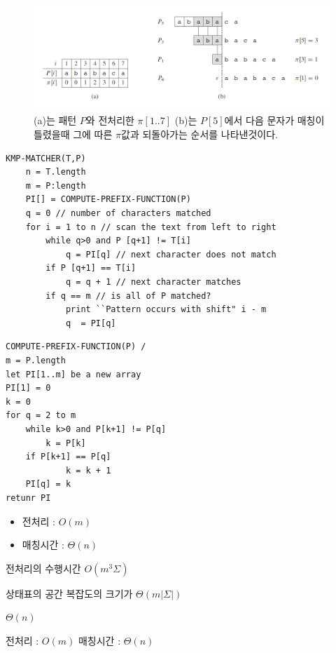 \begin{frame}
\begin{figure}[h!]
    \centering
    \includegraphics[scale=0.4]{pic4.PNG}
    \caption{(a)는 패턴 $P$와 전처리한 $\pi[1..7]$ (b)는 $P[5]$에서 다음 문자가 매칭이 틀렸을때 그에 따른 $\pi$값과 되돌아가는 순서를 나타낸것이다.}
\end{figure}

\begin{frame}
\begin{lstlisting}[style = CStyle]
KMP-MATCHER(T,P)
    n = T.length
    m = P:length
    PI[] = COMPUTE-PREFIX-FUNCTION(P)
    q = 0 // number of characters matched
    for i = 1 to n // scan the text from left to right
        while q>0 and P [q+1] != T[i]
            q = PI[q] // next character does not match  
        if P [q+1] == T[i]
            q = q + 1 // next character matches
        if q == m // is all of P matched?
            print ``Pattern occurs with shift" i - m
            q  = PI[q]
\end{lstlisting}
\end{frame}




\begin{frame}
\begin{lstlisting}[style = CStyle]
COMPUTE-PREFIX-FUNCTION(P) /
m = P.length
let PI[1..m] be a new array
PI[1] = 0
k = 0
for q = 2 to m
    while k>0 and P[k+1] != P[q]
        k = P[k]
    if P[k+1] == P[q]
            k = k + 1
    PI[q] = k 
retunr PI
\end{lstlisting}

\end{frame}
\begin{itemize}
    \item 전처리 : $O(m)$
    \item 매칭시간 : $\Theta(n)$
\end{itemize}
\end{frame}

\begin{frame}[정리]



    \item 전처리의 수행시간 $O(m^3 \Sigma)$
    \item 상태표의 공간 복잡도의 크기가 $\Theta(m|\Sigma|)$
    \item $\Theta(n)$
    
    전처리 : $O(m)$  매칭시간 : $\Theta(n)$
\end{frame}
